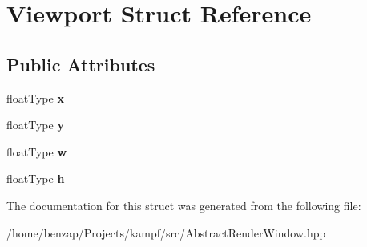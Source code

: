 \hypertarget{structViewport}{\section{Viewport Struct Reference}
\label{structViewport}
}
\subsection*{Public Attributes}
\begin{DoxyCompactItemize}
\item 
\hypertarget{structViewport_a3cc3d0378d31cb318c95d66f2335f554}{float\-Type {\bfseries x}}\label{structViewport_a3cc3d0378d31cb318c95d66f2335f554}

\item 
\hypertarget{structViewport_a61d583a333c780d932ecb4a3e09b8424}{float\-Type {\bfseries y}}\label{structViewport_a61d583a333c780d932ecb4a3e09b8424}

\item 
\hypertarget{structViewport_a9c5b62689f3208d24937d9066849dd01}{float\-Type {\bfseries w}}\label{structViewport_a9c5b62689f3208d24937d9066849dd01}

\item 
\hypertarget{structViewport_a6262de638b3d08a2fede0a972aa5734d}{float\-Type {\bfseries h}}\label{structViewport_a6262de638b3d08a2fede0a972aa5734d}

\end{DoxyCompactItemize}


The documentation for this struct was generated from the following file\-:\begin{DoxyCompactItemize}
\item 
/home/benzap/\-Projects/kampf/src/Abstract\-Render\-Window.\-hpp\end{DoxyCompactItemize}
